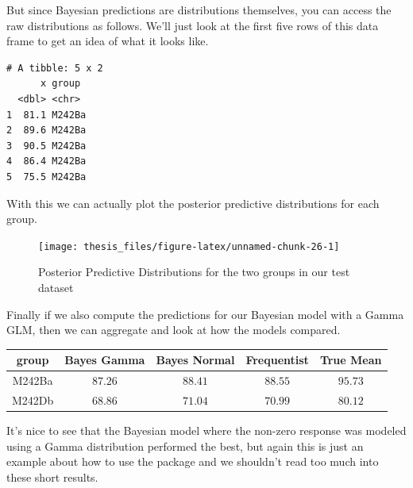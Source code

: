 \documentclass[12pt,twoside]{reedthesis}
\newenvironment{Shaded}{\begin{snugshade}}{\end{snugshade}}
\newcommand{\AttributeTok}[1]{\textcolor[rgb]{0.77,0.63,0.00}{#1}}
\newcommand{\ConstantTok}[1]{\textcolor[rgb]{0.00,0.00,0.00}{#1}}
\newcommand{\DecValTok}[1]{\textcolor[rgb]{0.00,0.00,0.81}{#1}}
\newcommand{\FloatTok}[1]{\textcolor[rgb]{0.00,0.00,0.81}{#1}}
\newcommand{\FunctionTok}[1]{\textcolor[rgb]{0.00,0.00,0.00}{#1}}
\newcommand{\NormalTok}[1]{#1}
\newcommand{\SpecialCharTok}[1]{\textcolor[rgb]{0.00,0.00,0.00}{#1}}
\begin{document}
But since Bayesian predictions are distributions themselves, you can access the raw distributions as follows. We'll just look at the first five rows of this data frame to get an idea of what it looks like.
\begin{Shaded}
\end{Shaded}
\begin{verbatim}
# A tibble: 5 x 2
      x group 
  <dbl> <chr> 
1  81.1 M242Ba
2  89.6 M242Ba
3  90.5 M242Ba
4  86.4 M242Ba
5  75.5 M242Ba
\end{verbatim}
With this we can actually plot the posterior predictive distributions for each group.
\begin{Shaded}
\end{Shaded}
\begin{figure}

{\centering \texttt{[image: thesis\_files/figure-latex/unnamed-chunk-26-1]} 

}

\caption{Posterior Predictive Distributions for the two groups in our test dataset}\label{fig:unnamed-chunk-26}
\end{figure}
Finally if we also compute the predictions for our Bayesian model with a Gamma GLM, then we can aggregate and look at how the models compared.
\begin{longtable}{ccccc}
\toprule
group & Bayes Gamma & Bayes Normal & Frequentist & True Mean \\ 
\midrule
M242Ba & $87.26$ & $88.41$ & $88.55$ & $95.73$ \\ 
M242Db & $68.86$ & $71.04$ & $70.99$ & $80.12$ \\ 
\bottomrule
\end{longtable}
It's nice to see that the Bayesian model where the non-zero response was modeled using a Gamma distribution performed the best, but again this is just an example about how to use the package and we shouldn't read too much into these short results.
\end{document}
